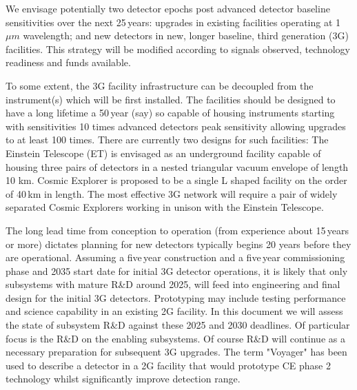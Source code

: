 We envisage potentially two detector epochs post advanced detector baseline sensitivities over the next 25\,years: upgrades in existing facilities operating at 1\,$\mu m$ wavelength; and new detectors in new, longer baseline, third generation (3G) facilities. This strategy will be modified according to signals observed, technology readiness and funds available.

To some extent, the 3G facility infrastructure can be decoupled from the instrument(s) which will be first installed. The facilities should be designed to have a long lifetime a 50\,year (say) so capable of housing instruments starting with sensitivities 10 times advanced detectors peak sensitivity allowing  upgrades to at least 100 times.  There are currently two designs for such facilities:  The Einstein Telescope (ET) is envisaged as an underground facility capable of housing three pairs of detectors in a nested triangular vacuum envelope of length 10 km. Cosmic Explorer is proposed to be a single L shaped facility on the order of  40\,km in length. The most effective 3G network will require a pair of widely separated Cosmic Explorers working in unison with the Einstein Telescope.  

The long lead time from conception to operation (from experience about 15\,years or more) dictates planning for new detectors typically begins 20 years before they are operational.  Assuming a five\,year construction and a five\,year commissioning phase and 2035 start date for initial 3G detector operations, it is likely that only subsystems with mature R\&D  around 2025, will feed into engineering and final design for the initial 3G detectors.  Prototyping may include testing performance and science capability in an existing 2G facility. In this document we will assess the state of subsystem R\&D against these 2025 and 2030  deadlines.  Of particular  focus is the R\&D on the enabling subsystems.  Of course R\&D will continue as a necessary preparation for subsequent 3G upgrades. The term "Voyager" has been used to describe a detector in a 2G facility  that would prototype CE phase 2 technology whilst significantly improve  detection range. 


